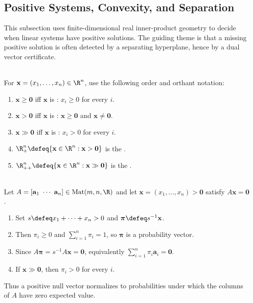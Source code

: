 \subsection{Positive Systems, Convexity, and Separation}

%

This subsection uses finite-dimensional real inner-product geometry to decide when linear systems have positive solutions. The guiding theme is that a missing positive solution is often detected by a separating hyperplane, hence by a dual vector certificate.

\begin{definition} \label{def:positive-vector-orders-orthants} \\
For $\mathbf{x}=(x_1,\ldots,x_n)\in\R^n$, use the following order and orthant notation:
\begin{enumerate}[label=(\roman*)]
\setlength{\itemsep}{0pt}
\item $\mathbf{x}\geq\mathbf{0}$ iff $\mathbf{x}$ is : $x_i\geq0$ for every $i$.
\item $\mathbf{x}>\mathbf{0}$ iff $\mathbf{x}$ is : $\mathbf{x}\geq\mathbf{0}$ and $\mathbf{x}\neq\mathbf{0}$.
\item $\mathbf{x}\gg\mathbf{0}$ iff $\mathbf{x}$ is : $x_i>0$ for every $i$.
\item $\R_+^n\defeq\{\mathbf{x}\in\R^n:\mathbf{x}>\mathbf{0}\}$ is the .
\item $\R_{++}^n\defeq\{\mathbf{x}\in\R^n:\mathbf{x}\gg\mathbf{0}\}$ is the .
\end{enumerate}
\end{definition}

\begin{motivation} \label{mot:positive-solutions-probability-distributions} \\
Let $A=[\mathbf{a}_1\ \cdots\ \mathbf{a}_n]\in\operatorname{Mat}(m,n,\R)$ and let $\mathbf{x}=(x_1,\ldots,x_n)>\mathbf{0}$ satisfy $A\mathbf{x}=\mathbf{0}$.
\begin{enumerate}[label=(\roman*)]
\setlength{\itemsep}{0pt}
\item Set $s\defeq x_1+\cdots+x_n>0$ and $\boldsymbol{\pi}\defeq s^{-1}\mathbf{x}$.
\item Then $\pi_i\geq0$ and $\sum_{i=1}^n\pi_i=1$, so $\boldsymbol{\pi}$ is a probability vector.
\item Since $A\boldsymbol{\pi}=s^{-1}A\mathbf{x}=\mathbf{0}$, equivalently $\sum\limits_{i=1}^n\pi_i\mathbf{a}_i=\mathbf{0}$.
\item If $\mathbf{x}\gg\mathbf{0}$, then $\pi_i>0$ for every $i$.
\end{enumerate}
Thus a positive null vector normalizes to probabilities under which the columns of $A$ have zero expected value.
\end{motivation}

